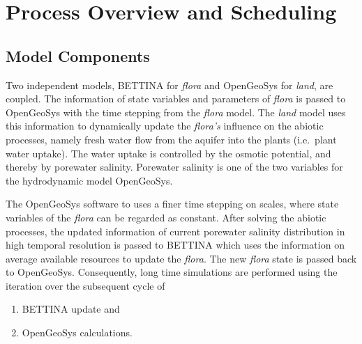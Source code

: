 \documentclass[manusscript, 12p, authoryear]{elsarticle}
\begin{document}
\section{Process Overview and Scheduling}
\subsection{Model Components} 
Two independent models, BETTINA for \textit{flora} and OpenGeoSys for \textit{land}, are coupled.
The information of state variables and parameters of \textit{flora} is passed to OpenGeoSys with the time stepping from the \textit{flora} model.
The \textit{land} model uses this information to dynamically update the \textit{flora's} influence on the abiotic processes, namely fresh water flow from the aquifer into the plants (i.e.~plant water uptake).
The water uptake is controlled by the osmotic potential, and thereby by porewater salinity.
Porewater salinity is one of the two variables for the hydrodynamic model OpenGeoSys.

The OpenGeoSys software to uses a finer time stepping on scales, where state variables of the \textit{flora} can be regarded as constant.
After solving the abiotic processes, the updated information of current porewater salinity distribution in high temporal resolution is passed to BETTINA which uses the information on average available resources to update the \textit{flora}.
The new \textit{flora} state is passed back to OpenGeoSys.
Consequently, long time simulations are performed using the iteration over the subsequent cycle of
\begin{enumerate}
\item BETTINA update and
\item OpenGeoSys calculations.

\end{enumerate}
\end{document}
